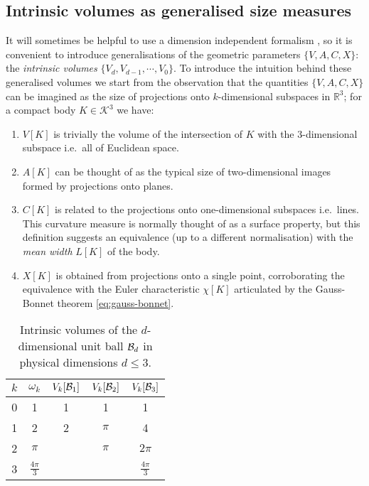 \subsection{Intrinsic volumes as generalised size measures}

It will sometimes be helpful to use a dimension independent formalism%
,
so it is convenient to introduce generalisations of the geometric parameters $\{V,A,C,X\}$: the \emph{intrinsic volumes} $\{V_d, V_{d-1}, \cdots, V_0\}$.
To introduce the intuition behind these generalised volumes we start from the observation that the quantities $\{V,A,C,X\}$ can be imagined as the size of projections onto $k$-dimensional subspaces in $\mathbb{R}^3$; for a compact body $K \in \mathcal{K}^3$ we have:
\begin{enumerate}
\item $V[K]$ is trivially the volume of the intersection of $K$ with the 3-dimensional subspace i.e.\ all of Euclidean space.
\item $A[K]$ can be thought of as the typical size of two-dimensional images formed by projections onto planes.
\item $C[K]$ is related to the projections onto one-dimensional subspaces i.e.\ lines.
  This curvature measure is normally thought of as a surface property, but this definition suggests an equivalence (up to a different normalisation) with the \emph{mean width} $L[K]$ of the body.
\item $X[K]$ is obtained from projections onto a single point, corroborating the equivalence with the Euler characteristic $\chi[K]$ articulated by the Gauss-Bonnet theorem \eqref{eq:gauss-bonnet}.
\end{enumerate}

\begin{SCtable}
  \begin{minipage}[b]{\linewidth}
    \centering
    \begin{tabular}{ccccc}
      \toprule
      $k$ & $\omega_k$ & $V_k[\mathcal{B}_1]$ & $V_k[\mathcal{B}_2]$ & $V_k[\mathcal{B}_3]$ \\
      \midrule
      0 & 1 & 1 & 1 & 1 \\
      1 & 2 & 2 & $\pi$ & 4 \\
      2 & $\pi$ && $\pi$ & $2\pi$ \\
      3 & $\frac{4\pi}{3}$ &&& $\frac{4\pi}{3}$ \\
      \bottomrule
    \end{tabular}
  \end{minipage}
  \caption{Intrinsic volumes of the $d$-dimensional unit ball $\mathcal{B}_d$ in physical dimensions $d \le 3$.}
  \label{table:ball-intrinsic-volumes}
\end{SCtable}

